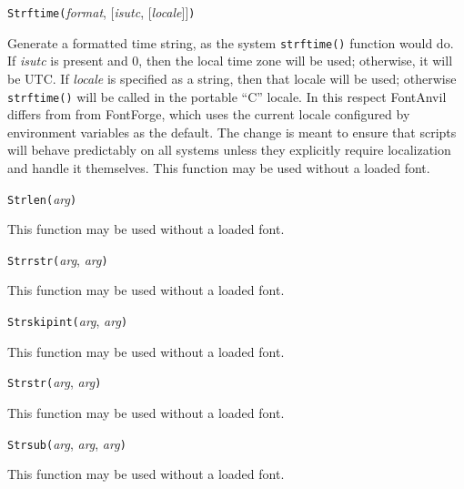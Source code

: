 \texttt{Strftime(}\textit{format}, [\textit{isutc}, [\textit{locale}]]\texttt{)}

Generate a formatted time string, as the system \texttt{strftime()} function
would do.  If \textit{isutc} is present and 0, then the local time zone will
be used; otherwise, it will be UTC.  If \textit{locale} is specified as a
string, then that locale will be used; otherwise \texttt{strftime()} will be
called in the portable ``C'' locale.  In this respect FontAnvil differs from
from \FFdiff FontForge, which uses the current locale configured by
environment variables as the default.  The change is meant to ensure that
scripts will behave predictably on all systems unless they explicitly
require localization and handle it themselves.  This function may be used
without a loaded font.



\texttt{Strlen(}\textit{arg}\texttt{)}

This function may be used without a loaded font.



\texttt{Strrstr(}\textit{arg}, \textit{arg}\texttt{)}

This function may be used without a loaded font.



\texttt{Strskipint(}\textit{arg}, \textit{arg}\texttt{)}

This function may be used without a loaded font.



\texttt{Strstr(}\textit{arg}, \textit{arg}\texttt{)}

This function may be used without a loaded font.



\texttt{Strsub(}\textit{arg}, \textit{arg}, \textit{arg}\texttt{)}

This function may be used without a loaded font.



